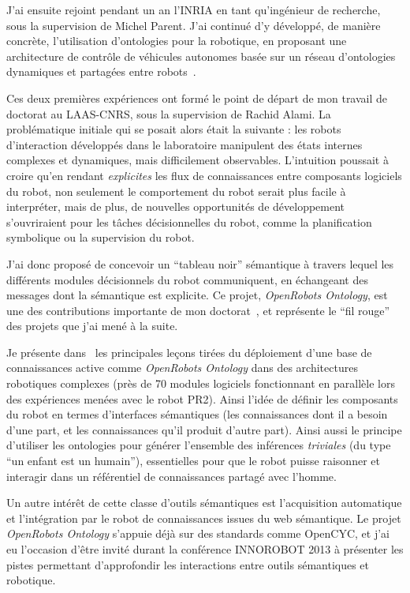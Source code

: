 \documentclass[a4paper]{article}
\begin{document}
J'ai ensuite rejoint pendant un an l'INRIA en tant qu'ingénieur de recherche,
sous la supervision de Michel Parent.  J'ai continué d'y développé, de manière concrète,
l'utilisation d'ontologies pour la robotique, en proposant une architecture de
contrôle de véhicules autonomes basée sur un réseau d'ontologies dynamiques et
partagées entre robots~\cite{mehani2007networking}.

Ces deux premières expériences ont formé le point de départ de mon travail de
doctorat au LAAS-CNRS, sous la supervision de Rachid Alami. La problématique
initiale qui se posait alors était la suivante : les robots d'interaction
développés dans le laboratoire manipulent des états internes complexes et
dynamiques, mais difficilement observables. L'intuition poussait à croire qu'en
rendant \emph{explicites} les flux de connaissances entre composants logiciels
du robot, non seulement le comportement du robot serait plus facile à
interpréter, mais de plus, de nouvelles opportunités de développement
s'ouvriraient pour les tâches décisionnelles du robot, comme la planification
symbolique ou la supervision du robot.

J'ai donc proposé de concevoir un ``tableau noir'' sémantique à travers lequel
les différents modules décisionnels du robot communiquent, en échangeant des
messages dont la sémantique est explicite. Ce projet, \emph{OpenRobots
Ontology}, est une des contributions importante de mon
doctorat~\cite{Lemaignan2010}, et représente le ``fil rouge'' des projets
que j'ai mené à la suite.

Je présente dans~\cite{lemaignan2013explicit} les principales leçons tirées du
déploiement d'une base de connaissances active comme \emph{OpenRobots Ontology}
dans des architectures robotiques complexes (près de 70 modules logiciels
fonctionnant en parallèle lors des expériences menées avec le robot PR2). Ainsi
l'idée de définir les composants du robot en termes d'interfaces sémantiques
(les connaissances dont il a besoin d'une part, et les
connaissances qu'il produit d'autre part). Ainsi aussi le principe d'utiliser
les ontologies pour générer l'ensemble des inférences \emph{triviales} (du type
``un enfant est un humain''), essentielles pour que le robot puisse raisonner et
interagir dans un référentiel de connaissances partagé avec l'homme.

Un autre intérêt de cette classe d'outils sémantiques est l'acquisition
automatique et l'intégration par le robot de connaissances issues du web
sémantique. Le projet \emph{OpenRobots Ontology} s'appuie déjà sur des
standards comme {\sc OpenCYC}, et j'ai eu l'occasion d'être invité durant la
conférence INNOROBOT 2013 à présenter les pistes permettant d'approfondir les
interactions entre outils sémantiques et robotique.
\end{document}
